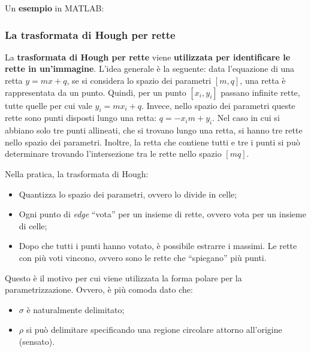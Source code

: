 \documentclass[a4paper]{article}
\newcommand{\dquotes}[1]{``#1''}
\begin{document}
	\noindent
	Un \textcolor{Green4}{\textbf{esempio}} in MATLAB:
	\newpage
	
	\subsubsection{La trasformata di Hough per rette}
	
	La \textcolor{Red3}{\textbf{trasformata di Hough per rette}} viene \textbf{utilizzata per identificare le rette in un'immagine}. L'idea generale è la seguente: data l'equazione di una retta $y = mx + q$, se si considera lo spazio dei parametri $\left[m,q\right]$, una retta è rappresentata da un punto. Quindi, per un punto $\left[x_{i}, y_{i}\right]$ passano infinite rette, tutte quelle per cui vale $y_{i} = mx_{i} + q$. Invece, nello spazio dei parametri queste rette sono punti disposti lungo una retta: $q = -x_{i} m + y_{i}$. Nel caso in cui si abbiano solo tre punti allineati, che si trovano lungo una retta, si hanno tre rette nello spazio dei parametri. Inoltre, la retta che contiene tutti e tre i punti si può determinare trovando l'intersezione tra le rette nello spazio $\left[mq\right]$.\newline
	
	\noindent
	Nella pratica, la trasformata di Hough:
	\begin{itemize}
		\item Quantizza lo spazio dei parametri, ovvero lo divide in celle;
		
		\item Ogni punto di \emph{edge} \dquotes{vota} per un insieme di rette, ovvero vota per un insieme di celle;
		
		\item Dopo che tutti i punti hanno votato, è possibile estrarre i massimi. Le rette con più voti vincono, ovvero sono le rette che \dquotes{spiegano} più punti.
	\end{itemize}
	Questo è il motivo per cui viene utilizzata la forma polare per la parametrizzazione. Ovvero, è più comoda dato che:
	\begin{itemize}
		\item $\sigma$ è naturalmente delimitato;
		
		\item $\rho$ si può delimitare specificando una regione circolare attorno all'origine (sensato).
	\end{itemize}
	
\end{document}

